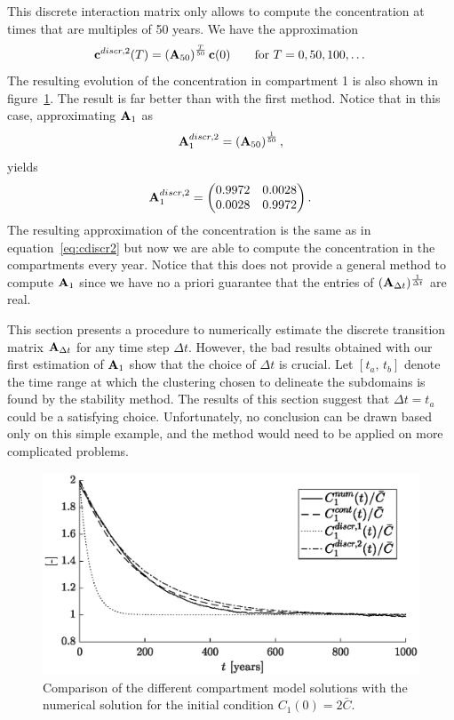 This discrete interaction matrix only allows to compute the concentration at times that are multiples of 50 years. We have the approximation
\begin{equation} \label{eq:cdiscr2}
	\mathbf c^{discr,2}(T) = \left(\mathbf A_{50}\right)^{\frac{T}{50}} \mathbf c(0) \qquad \mbox{for } T = 0,50,100,\dots
\end{equation}
The resulting evolution of the concentration in compartment 1 is also shown in figure~\ref{fig:comparison_comp-real1}. The result is far better than with the first method. Notice that in this case, approximating $\mathbf A_1$ as
\begin{equation}
	\mathbf A_1^{discr,2} = \left(\mathbf A_{50}\right)^{\frac{1}{50}},
\end{equation}
yields
\begin{equation}
	\mathbf A_1^{discr,2} = \begin{pmatrix}
		0.9972 & 0.0028 \\ 
		0.0028 & 0.9972
	\end{pmatrix}.
\end{equation}
The resulting approximation of the concentration is the same as in equation~\eqref{eq:cdiscr2} but now we are able to compute the concentration in the compartments every year. Notice that this does not provide a general method to compute $\mathbf A_1$ since we have no a priori guarantee that the entries of $(\mathbf A_{\Delta t})^{\frac{1}{\Delta t}}$ are real.

This section presents a procedure to numerically estimate the discrete transition matrix $\mathbf A_{\Delta t}$ for any time step $\Delta t$. However, the bad results obtained with our first estimation of $\mathbf A_1$ show that the choice of $\Delta t$ is crucial. Let $[t_a,\, t_b]$ denote the time range at which the clustering chosen to delineate the subdomains is found by the stability method. The results of this section suggest that $\Delta t = t_a$ could be a satisfying choice. Unfortunately, no conclusion can be drawn based only on this simple example, and the method would need to be applied on more complicated problems.

\begin{figure}[!htp]
	\centering
	\includegraphics[width=\textwidth]{fig/problem2box/C1vsC1tilde1_1000years2.eps}
	\caption{Comparison of the different compartment model solutions with the numerical solution for the initial condition $C_1(0) = 2\bar C$.}
	\label{fig:comparison_comp-real1}
\end{figure}